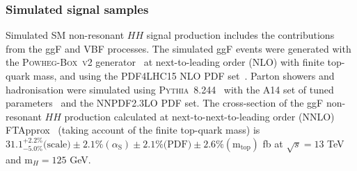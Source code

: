 \subsubsection{Simulated signal samples}
Simulated SM non-resonant $HH$ signal production includes the contributions
from the ggF and VBF processes.
The simulated ggF events were generated with the \textsc{Powheg-Box~v2} generator~\cite{Alioli:2010xd}
at next-to-leading order (NLO) with finite top-quark mass,
and using the \textsc{PDF4LHC15} NLO PDF set~\cite{Butterworth:2015oua}.
Parton showers and hadronisation were simulated using \textsc{Pythia~8.244}~\cite{Sjostrand:2007gs}
with the A14 set of tuned parameters~\cite{ATL-PHYS-PUB-2014-021,ATLAS:2012uec} and the \textsc{NNPDF2.3LO} PDF set.
The cross-section of the ggF non-resonant $HH$ production 
calculated at next-to-next-to-leading order (NNLO) FTApprox~\cite{Grazzini:2018bsd} 
(taking account of the finite top-quark mass) is
$31.1^{+2.2\%}_{-5.0\%}\text{(scale)}\pm 2.1\%(\alpha_\text{S})\pm 2.1\%\text{(PDF)}\pm 2.6\%(\text{m}_\text{top})$ fb
at $\sqrt{s}=13$ TeV and $\text{m}_{H}=125$ GeV.

